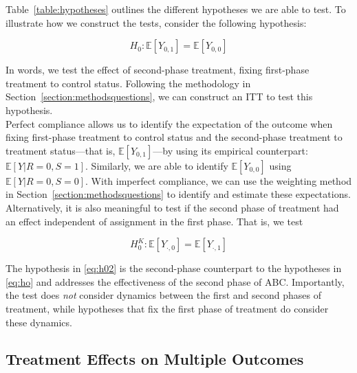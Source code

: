 \noindent Table~\ref{table:hypotheses} outlines the different hypotheses we are able to test. To illustrate how we construct the tests, consider the following hypothesis: 

\begin{equation}
H_{0}: \mathbb{E} \left[ Y_{0,1} \right]  = \mathbb{E} \left[ Y_{0,0} \right]  \label{eq:h0fixfirst}
\end{equation}

\noindent In words, we test the effect of second-phase treatment, fixing first-phase treatment to control status. Following the methodology in Section~\ref{section:methodsquestions}, we can construct an ITT to test this hypothesis.\\

\noindent Perfect compliance allows us to identify the expectation of the outcome when fixing first-phase treatment to control status and the second-phase treatment to treatment status---that is, $\mathbb{E} \left[ Y_{0,1} \right]$---by using its empirical counterpart: $\mathbb{E} \left[ Y | R = 0, S = 1 \right]$. Similarly, we are able to identify $\mathbb{E} \left[ Y_{0,0} \right]$ using $\mathbb{E} \left[ Y | R = 0, S = 0 \right]$. With imperfect compliance, we can use the weighting method in Section~\ref{section:methodsquestions} to identify and estimate these expectations.\\

\noindent Alternatively, it is also meaningful to test if the second phase of treatment had an effect independent of assignment in the first phase. That is, we test

\begin{equation}
H_{0}^K: \mathbb{E} \left[ Y_{\cdot,0} \right] = \mathbb{E} \left[ Y_{\cdot,1} \right] \label{eq:h02}
\end{equation}

\noindent The hypothesis in \eqref{eq:h02} is the second-phase counterpart to the hypotheses in \eqref{eq:ho} and addresses the effectiveness of the second phase of ABC. Importantly, the test does \emph{not} consider dynamics between the first and second phases of treatment, while hypotheses that fix the first phase of treatment do consider these dynamics.\\

\subsection{Treatment Effects on Multiple Outcomes} \label{section:counts}


